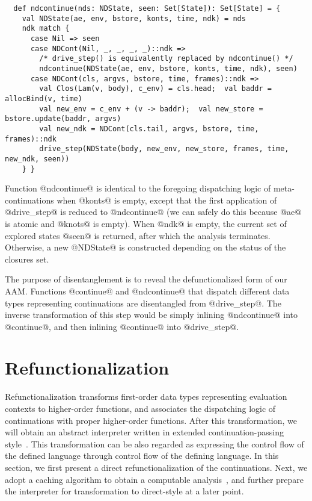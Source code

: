 \documentclass[acmsmall, screen]{acmart}\settopmatter{}
\begin{document}
\begin{lstlisting}
  def ndcontinue(nds: NDState, seen: Set[State]): Set[State] = {
    val NDState(ae, env, bstore, konts, time, ndk) = nds
    ndk match {
      case Nil => seen
      case NDCont(Nil, _, _, _, _)::ndk =>
        /* drive_step() is equivalently replaced by ndcontinue() */
        ndcontinue(NDState(ae, env, bstore, konts, time, ndk), seen)
      case NDCont(cls, argvs, bstore, time, frames)::ndk =>
        val Clos(Lam(v, body), c_env) = cls.head;  val baddr = allocBind(v, time)
        val new_env = c_env + (v -> baddr);  val new_store = bstore.update(baddr, argvs)
        val new_ndk = NDCont(cls.tail, argvs, bstore, time, frames)::ndk
        drive_step(NDState(body, new_env, new_store, frames, time, new_ndk, seen))
    } }
\end{lstlisting}

Function @ndcontinue@ is identical to the foregoing dispatching logic of meta-continuations when @konts@ is empty,
except that the first application of @drive_step@ is reduced to @ndcontinue@ (we can safely do this because 
@ae@ is atomic and @knots@ is empty).
When @ndk@ is empty, the current set of explored states @seen@ is returned, after which the analysis terminates.
Otherwise, a new @NDState@ is constructed depending on the status of the closures set.

The purpose of disentanglement is to reveal the defunctionalized form of our AAM.
Functions @continue@ and @ndcontinue@ that dispatch different data types representing
continuations are disentangled from @drive_step@.
The inverse transformation of this step would be simply inlining @ndcontinue@ into @continue@,
and then inlining @continue@ into @drive_step@.

\section{Refunctionalization} \label{sec:refunc}

Refunctionalization transforms first-order data types representing evaluation contexts
to higher-order functions, and associates the dispatching logic of continuations with
proper higher-order functions.
After this transformation, we will obtain an abstract interpreter written in extended
continuation-passing style~\cite{Danvy:1990:AC:91556.91622}.
This transformation can be also regarded as expressing the control flow of the defined
language through control flow of the defining language.
In this section, we first present a direct refunctionalization of the continuations.
Next, we adopt a caching algorithm to obtain a computable analysis~\cite{darais2017abstracting},
and further prepare the interpreter for transformation to direct-style at a later point.
\end{document}
